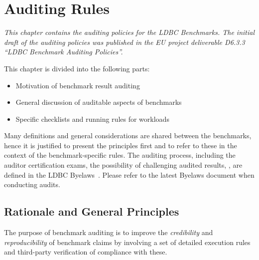 \chapter{Auditing Rules}
\label{sec:auditing-rules}

\emph{This chapter contains the auditing policies for the LDBC Benchmarks. The initial draft of the auditing policies was published in the EU project deliverable D6.3.3 ``LDBC Benchmark Auditing Policies''.}


This chapter is divided into the following parts:
\begin{itemize}
    \item Motivation of benchmark result auditing
    \item General discussion of auditable aspects of benchmarks
    \item Specific checklists and running rules for \ldbcfinbench workloads
\end{itemize}

Many definitions and general considerations are shared between the benchmarks, hence it is justified to present the
principles first and to refer to these in the context of the benchmark-specific rules. The auditing process, including
the auditor certification exams, the possibility of challenging audited results, \etc, are defined in the LDBC
Byelaws~\cite{ldbc_byelaws}. Please refer to the latest Byelaws document when conducting audits.


\section{Rationale and General Principles}


The purpose of benchmark auditing is to improve the \emph{credibility} and \emph{reproducibility} of benchmark claims by involving a set of detailed execution rules and third-party verification of compliance with these.

